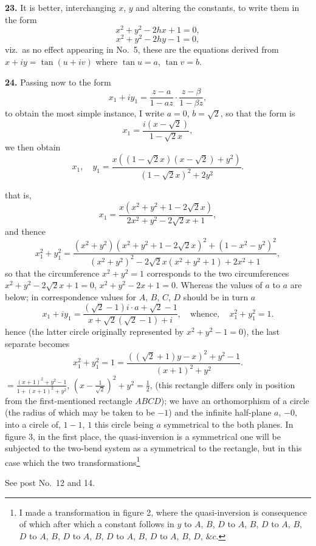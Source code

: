 \documentclass[11pt,a4paper]{article}
\begin{document}
\textbf{23.} It is better, interchanging $x$, $y$ and altering the constants, to write them in the form
\[
x^2 + y^2 - 2hx + 1 = 0,
\]
\[
x^2 + y^2 - 2hy - 1 = 0,
\]
viz.\ as no effect appearing in No.\ 5, these are the equations derived from $x + iy = \tan (u + iv)$ where $\tan u = a$, $\tan v = b$.

\textbf{24.} Passing now to the form
\[
x_1 + iy_1 = \frac{z - a}{1 - a z} \cdot \frac{z - \beta}{1 - \beta z},
\]
to obtain the most simple instance, I write $a = 0$, $b = \sqrt{2}$, so that the form is
\[
x_1 = \frac{i(x - \sqrt{2})}{1 - \sqrt{2}x},
\]
we then obtain
\[
x_1, \quad y_1 = \frac{x((1 - \sqrt{2}x)(x - \sqrt{2}) + y^2)}{(1 - \sqrt{2}x)^2 + 2y^2}.
\]

that is,
\[
x_1 = \frac{x(x^2 + y^2 + 1 - 2\sqrt{2}x)}{2x^2 + y^2 - 2\sqrt{2}x + 1},
\]
and thence
\[
x_1^2 + y_1^2 = \frac{(x^2 + y^2)(x^2 + y^2 + 1 - 2\sqrt{2}x)^2 + (1 - x^2 - y^2)^2}{(x^2 + y^2)^2 - 2\sqrt{2}x(x^2 + y^2 + 1) + 2x^2 + 1},
\]
so that the circumference $x^2 + y^2 = 1$ corresponds to the two circumferences $x^2 + y^2 - 2\sqrt{2}x + 1 = 0$, $x^2 + y^2 - 2x + 1 = 0$. Whereas the values of $a$ to $a$ are below; in correspondence values for $A$, $B$, $C$, $D$ should be in turn $a$
\[
x_1 + iy_1 = \frac{(\sqrt{2} - 1)i \cdot a + \sqrt{2} - 1}{x + \sqrt{2}(\sqrt{2} - 1) + i}, \quad \text{whence}, \quad x_1^2 + y_1^2 = 1.
\]
hence (the latter circle originally represented by $x^2 + y^2 - 1 = 0$), the last separate becomes
\[
x_1^2 + y_1^2 = 1 = \frac{((\sqrt{2} + 1)y - x)^2 + y^2 - 1}{(x + 1)^2 + y^2}.
\]
$= \frac{(x + 1)^2 + y^2 - 1}{1 + (x + 1)^2 + y^2}$, $(x - \frac{1}{\sqrt{2}})^2 + y^2 = \frac{1}{2}$,
(this rectangle differs only in position from the first-mentioned rectangle $ABCD$); we have an orthomorphism of a circle (the radius of which may be taken to be $-1$) and the infinite half-plane $a$, $-0$, into a circle of, $1 - 1$, $1$ this circle being $a$ symmetrical to the both planes. In figure 3, in the first place, the quasi-inversion is a symmetrical one will be subjected to the two-bend system as a symmetrical to the rectangle, but in this case which the two transformations\footnote{I made a transformation in figure 2, where the quasi-inversion is consequence of which after which a constant follows in $y$ to $A$, $B$, $D$ to $A$, $B$, $D$ to $A$, $B$, $D$ to $A$, $B$, $D$ to $A$, $B$, $D$ to $A$, $B$, $D$ to $A$, $B$, $D$, $\&c$.}

\hspace*{\fill} See post No.\ 12 and 14.
\end{document}
